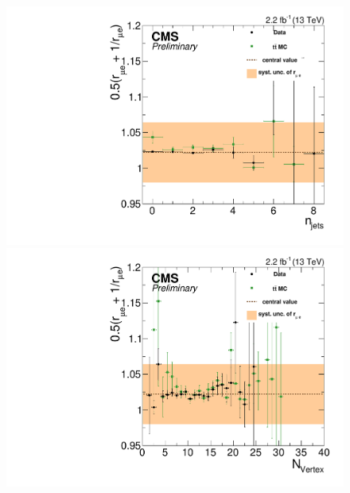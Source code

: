 \begin{figure}[htbp]
  \begin{minipage}[t]{0.3\textwidth}
    \includegraphics[width=\textwidth]{bkgd/figs/rSFOFFromRMuE_ZPeakControlForward_Run2015_25ns_NJets_None.pdf}
  \end{minipage}
  \begin{minipage}[t]{0.3\textwidth}
    \includegraphics[width=\textwidth]{bkgd/figs/rSFOFFromRMuE_ZPeakControlForward_Run2015_25ns_nVtx_None.pdf}
  \end{minipage}
  \begin{minipage}[t]{0.3\textwidth}

\end{minipage}
\end{figure}
